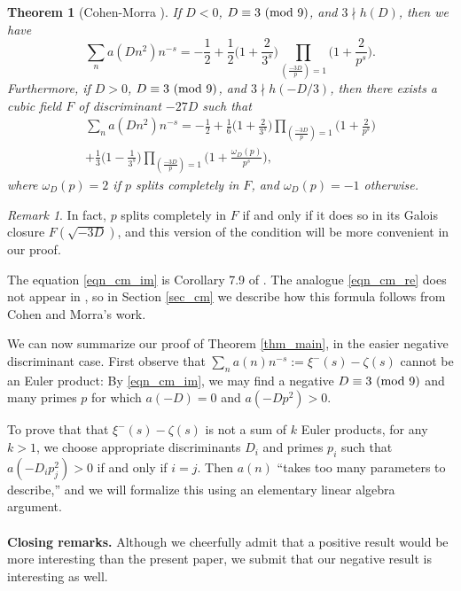 \documentclass[12pt]{amsart}
\newtheorem{theorem}{Theorem}
\theoremstyle{remark}
\newtheorem*{remark}{Remark}
\numberwithin{theorem}{section} \numberwithin{equation}{section}
\newcommand{\textmod}{{\text {\rm mod}}}
\begin{document}
\begin{theorem}[Cohen-Morra \cite{CM}]\label{thm_cm}
If $D < 0$, $D \equiv 3 \ (\textmod \ 9)$, and $3 \nmid h(D)$, then we have
\begin{equation}\label{eqn_cm_im}
\sum_n a(Dn^2) n^{-s} = - \frac{1}{2} + \frac{1}{2} \bigg(1 + \frac{2}{3^s} \bigg)
\prod_{ \left( \frac{ -3D}{p} \right) = 1 } \bigg(1 + \frac{2}{p^s} \bigg).
\end{equation}
Furthermore, if $D > 0$, $D \equiv 3 \ (\textmod \ 9)$, 
and $3 \nmid h(-D/3)$, then there exists a cubic field $F$ of discriminant $-27 D$ such that
\begin{multline}\label{eqn_cm_re}
\sum_n a(Dn^2) n^{-s} =  - \frac{1}{2} + \frac{1}{6} \bigg(1 + \frac{2}{3^s} \bigg)
\prod_{ \left( \frac{ -3D}{p} \right) = 1 } \bigg(1 + \frac{2}{p^s} \bigg)
\\ 
+ \frac{1}{3} \bigg(1 - \frac{1}{3^s} \bigg)
\prod_{ \left( \frac{ -3D}{p} \right) = 1 } \bigg(1 + \frac{\omega_D(p)}{p^s} \bigg), \ \ \ \ \  \ \ \
\end{multline}
where $\omega_D(p) = 2$
if $p$ splits completely in $F$, and $\omega_D(p) = -1$ otherwise. 
\end{theorem}
\begin{remark}
In fact, $p$ splits completely in $F$ if and only if it does so in its Galois closure
$F(\sqrt{-3D})$, and this version of the condition will be more convenient in our proof.
\end{remark}

The equation \eqref{eqn_cm_im} is Corollary 7.9 of \cite{CM}. The analogue \eqref{eqn_cm_re}
does not appear in \cite{CM, M}, so in Section \ref{sec_cm} we describe how this formula follows from Cohen and Morra's
work. 

We can now summarize our proof of Theorem \ref{thm_main}, in the
easier negative discriminant case. First observe that $\sum_n a(n) n^{-s} := \xi^-(s) - \zeta(s)$
cannot be an Euler product: By \eqref{eqn_cm_im}, we may find a negative 
$D \equiv 3 \ (\textmod \ 9)$ and many primes $p$ for which $a(-D) = 0$
and $a(-D p^2) > 0$.

To prove that
that $\xi^-(s) - \zeta(s)$ is not a sum of $k$ Euler products, for any $k > 1$, we choose appropriate
discriminants $D_i$ and primes $p_i$ such that
$a(-D_i p_j^2) > 0$ if and only if $i = j$. Then $a(n)$ ``takes too many parameters to describe,''
and we will formalize this using an elementary linear algebra argument.
\\
\\
{\bf Closing remarks.} Although we cheerfully admit that a positive result would be more interesting than the present paper,
we submit that our negative result is interesting as well.
\end{document}
